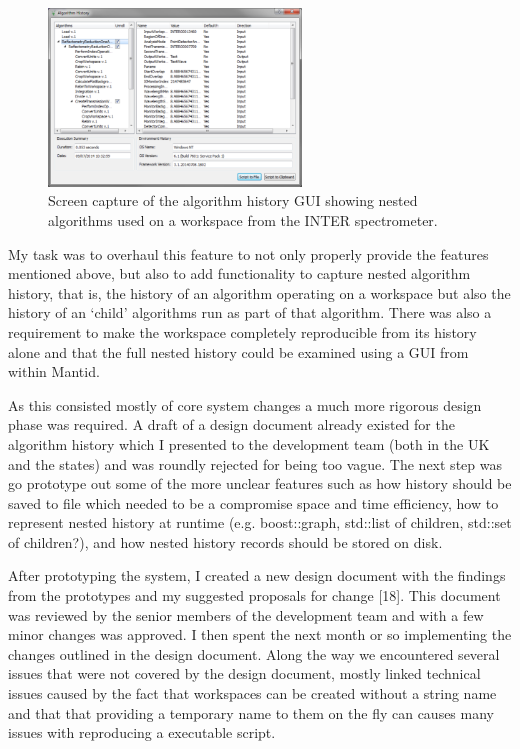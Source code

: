\documentclass[paper=a4, fontsize=11pt]{scrartcl}	%
\numberwithin{equation}{section}															%
\numberwithin{figure}{section}																%
\numberwithin{table}{section}
\begin{document}
\begin{figure}[H]
\centering
\includegraphics[width=0.6\textwidth]{img/algorithm-history.png}
\caption{Screen capture of the algorithm history GUI showing nested algorithms used on a workspace from the INTER spectrometer.}
\label{fig:algorithm-history}
\end{figure}

My task was to overhaul this feature to not only properly provide the
features mentioned above, but also to add functionality to capture
nested algorithm history, that is, the history of an algorithm operating
on a workspace but also the history of an `child' algorithms run as part
of that algorithm. There was also a requirement to make the workspace
completely reproducible from its history alone and that the full nested
history could be examined using a GUI from within Mantid.

As this consisted mostly of core system changes a much more rigorous
design phase was required. A draft of a design document already existed
for the algorithm history which I presented to the development team
(both in the UK and the states) and was roundly rejected for being too
vague. The next step was go prototype out some of the more unclear
features such as how history should be saved to file which needed to be
a compromise space and time efficiency, how to represent nested history
at runtime (e.g. boost::graph, std::list of children, std::set of children?),
and how nested history records should be stored on disk.

After prototyping the system, I created a new design document with the
findings from the prototypes and my suggested proposals for change
{[}18{]}. This document was reviewed by the senior members of the
development team and with a few minor changes was approved. I then spent
the next month or so implementing the changes outlined in the design
document. Along the way we encountered several issues that were not
covered by the design document, mostly linked technical issues caused by
the fact that workspaces can be created without a string name and that
that providing a temporary name to them on the fly can causes many
issues with reproducing a executable script.
\end{document}
